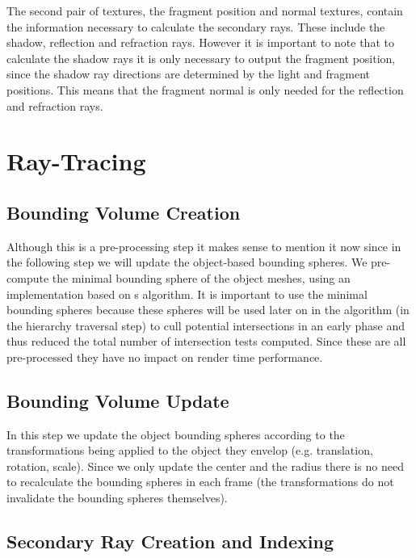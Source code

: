 \medskip

The second pair of textures, the fragment position and normal textures, contain the information necessary to calculate the secondary rays. These include the shadow, reflection and refraction rays. However it is important to note that to calculate the shadow rays it is only necessary to output the fragment position, since the shadow ray directions are determined by the light and fragment positions. This means that the fragment normal is only needed for the reflection and refraction rays.

\section{Ray-Tracing}
\label{section:algorithm-ray-tracing}

\subsection{Bounding Volume Creation}

Although this is a pre-processing step it makes sense to mention it now since in the following step we will update the object-based bounding spheres. We pre-compute the minimal bounding sphere of the object meshes, using an implementation based on \cite{Gartner99}s algorithm. It is important to use the minimal bounding spheres because these spheres will be used later on in the algorithm (in the hierarchy traversal step) to cull potential intersections in an early phase and thus reduced the total number of intersection tests computed. Since these are all pre-processed they have no impact on render time performance.

\subsection{Bounding Volume Update}

In this step we update the object bounding spheres according to the transformations being applied to the object they envelop (e.g. translation, rotation, scale). Since we only update the center and the radius there is no need to recalculate the bounding spheres in each frame (the transformations do not invalidate the bounding spheres themselves).

\subsection{Secondary Ray Creation and Indexing}


